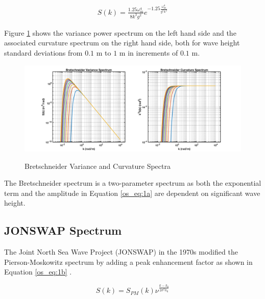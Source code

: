 \begin{equation}
  \begin{gathered}
  \label{os_eq:1a}
  S(k) = \frac{1.25 \omega_m^4}{8k^3g^2}e^{-1.25\frac{\omega_m^4}{g^2k^2}} 
  \end{gathered}
\end{equation}
\renewcommand{\baselinestretch}{2} \small\normalsize

Figure \ref{os_fig:1a} shows the variance power spectrum on the left hand side and the associated curvature spectrum on the right hand side, both for wave height standard deviations from $0.1$ m to $1$ m in increments of $0.1$ m.

 \begin{figure}[H]
  \begin{center}
\includegraphics[width=6in]{../media/Ocean_Surface/bs_variance_curvature_spectrum.png}
  \end{center}
  \renewcommand{\baselinestretch}{1} \small\normalsize
  \begin{quote}
    \caption[Bretschneider Variance and Curvature Spectra]{Bretschneider Variance and Curvature Spectra\label{os_fig:1a}}
  \end{quote}
\end{figure}
 \renewcommand{\baselinestretch}{2} \small\normalsize
 
The Bretschneider spectrum is a two-parameter spectrum as both the exponential term and the amplitude in Equation \ref{os_eq:1a} are dependent on significant wave height.

\subsection {JONSWAP Spectrum}
The Joint North Sea Wave Project (JONSWAP) in the 1970s modified the Pierson-Moskowitz spectrum by adding a peak enhancement factor as shown in Equation \ref{os_eq:1b} \cite{michel_sea_spectra}.

\begin{equation}
  \label{os_eq:1b}
  S(k) = S_{PM}(k)\nu^{\frac{k-k_0}{2\sigma^2k_0}} 
  \end{equation}
  

